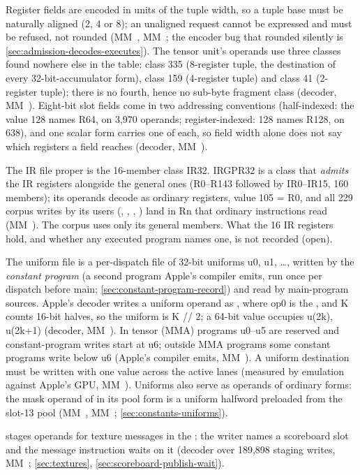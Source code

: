 Register fields are encoded in units of the tuple width, so a tuple base must be naturally
aligned (2, 4 or 8); an unaligned request cannot be expressed and must be refused, not rounded (MM~, MM~; the
encoder bug that rounded silently is \cref{sec:admission-decodes-executes}). The tensor unit's operands use three classes found nowhere else in
the table: class 335 (8-register tuple, the destination of every 32-bit-accumulator form), class 159 (4-register
tuple) and class 41 (2-register tuple); there is no fourth, hence no sub-byte fragment class (decoder, MM~). Eight-bit
slot fields come in two addressing conventions (half-indexed: the value 128 names R64, on 3,970 operands;
register-indexed: 128 names R128, on 638), and one scalar form carries one of each, so field width alone does not say
which registers a field reaches (decoder, MM~).

The IR file proper is the 16-member class IR32. IRGPR32 is a class that \emph{admits} the IR
registers alongside the general ones (R0–R143 followed by IR0–IR15, 160 members); its operands decode as ordinary
registers, value 105 = R0, and all 229 corpus writes by its users (, , , ) land in Rn that ordinary instructions read (MM~). The corpus uses only its general members. What the 16
IR registers hold, and whether any executed program names one, is not recorded (open).

The uniform file is a per-dispatch file of 32-bit uniforms u0, u1, \dots{}, written by the \emph{constant program} (a second
program Apple's compiler emits, run once per dispatch before main; \cref{sec:constant-program-record}) and read by main-program sources.
Apple's decoder writes a uniform operand as , where op0 is the , and K counts 16-bit halves, so the uniform is K // 2; a 64-bit value occupies u(2k), u(2k+1) (decoder, MM~). In tensor (MMA)
programs u0–u5 are reserved and constant-program writes start at u6; outside MMA programs some constant programs write
below u6 (Apple's compiler emits, MM~). A uniform destination must be written with one value across the active
lanes (measured by emulation against Apple's GPU, MM~). Uniforms also serve as operands of ordinary forms: the mask
operand of  in its pool form is a uniform halfword preloaded from the slot-13
pool (MM~, MM~; \cref{sec:constants-uniforms}).

 stages operands for texture messages in the ; the writer names a scoreboard slot and the message instruction waits on it
(decoder over 189,898 staging writes, MM~; \cref{sec:textures}, \cref{sec:scoreboard-publish-wait}).

